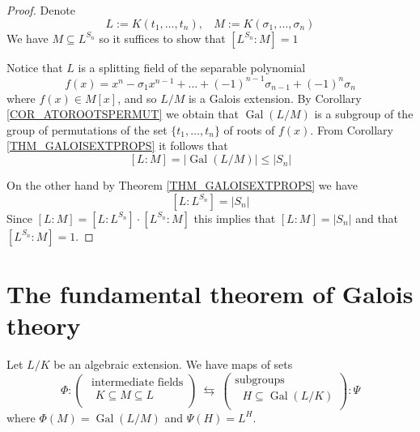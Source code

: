 \documentclass[12pt, letterpaper, oneside]{article}
\theoremstyle{plain}
\theoremstyle{definition}
\newcommand{\Gal}{\operatorname{Gal}}
\newcommand{\vs}{\vskip 5mm}
\begin{document}
\vs

\begin{proof}
Denote 
$$L:= K(t_{1}, \dots, t_{n}),  \ \ \ \ M := K(\sigma_{1}, \dots, \sigma_{n})$$
We have  $M \subseteq L^{S_{n}}$
so it suffices to show that  $[ L^{S_{n}} : M] =1$


Notice that $L$ is a splitting field of the separable polynomial 
$$f(x) =  x^{n} - \sigma_{1}x^{n-1} +  \dots + (-1)^{n-1}\sigma_{n-1} + (-1)^{n}\sigma_{n}$$
where $f(x) \in M[x]$, and so $L/M$ is a Galois extension. 
By  Corollary \ref{COR_ATOROOTSPERMUT} we obtain 
that $\Gal(L/M)$ is a subgroup of the group of permutations of the set $\{t_{1}, \dots, t_{n}\}$
of roots of  $f(x)$. From Corollary \ref{THM_GALOISEXTPROPS} it follows that
$$[L: M] = |\Gal(L/M)| \leq |S_{n}|$$

On the other hand by Theorem \ref{THM_GALOISEXTPROPS} we have 
$$[L: L^{S_{n}}] = |S_{n}|$$
Since  $[L:M] = [L:L^{S_{n}}]\cdot [L^{S_{n}}: M]$ this implies that $[L:M] = |S_{n}|$ and that 
$[L^{S_{n}}:M] =1$.



\end{proof}
















\newpage
\section{The fundamental theorem of Galois theory}
\label{SEC_FUNDTHMGALOISTHRY}



Let $L/K$ be an algebraic extension. We have maps of sets 
$$
\Phi\colon 
\begin{pmatrix}
\text{ intermediate fields} \\[1mm]
\text{  $K\subseteq M \subseteq L$} \\
\end{pmatrix}
\ \leftrightarrows \ 
\begin{pmatrix}
\text{subgroups} \\[1mm]
\text{ $H\subseteq \Gal(L/K)$} \\
\end{pmatrix}
\colon \Psi
$$
where $\Phi(M) = \Gal(L/M)$ and $\Psi(H) = L^{H}$. 
\end{document}
